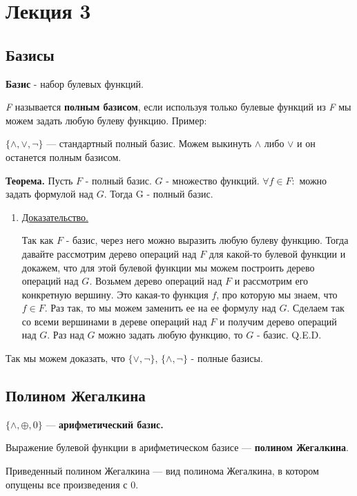 \documentclass{article}
\begin{document}
\section{Лекция 3}
\subsection{Базисы}

\textbf{Базис} - набор булевых функций.

\textit{F} называется \textbf{полным базисом}, если используя только булевые функций из \textit{F} мы можем задать любую булеву функцию. Пример:

$\{\wedge, \vee, \neg\}$ ---  стандартный полный базис. Можем выкинуть $\wedge$ либо $\vee$ 
 и он останется полным базисом.

\textbf{Теорема.} Пусть $F$ - полный базис. $G$ - множество функций.
$\forall f \in F:$ можно задать формулой над $G$.
Тогда G - полный базис.

\begin{enumerate}

\item[] \uline{Доказательство.}

Так как $F$ - базис, через него можно выразить любую булеву функцию. Тогда давайте рассмотрим дерево операций над $F$ для какой-то булевой функции и докажем, что для этой булевой функции мы можем построить дерево операций над $G$. Возьмем дерево операций над $F$ и рассмотрим его конкретную вершину. Это какая-то функция $f$, про которую мы знаем, что $f \in F$. Раз так, то мы можем заменить ее на ее формулу над $G$. Сделаем так со всеми вершинами в дереве операций над $F$ и получим дерево операций над $G$. Раз над $G$ можно задать любую функцию, то $G$ - базис. Q.E.D.

\end{enumerate}

Так мы можем доказать, что $\{\vee, \neg\}$, $\{\wedge, \neg\}$ - полные базисы.

\subsection{Полином Жегалкина}

$\{\wedge, \oplus, 0\}$ --- \textbf{арифметический базис.}

Выражение булевой функции в арифметическом базисе --- \textbf{полином Жегалкина}.

Приведенный полином Жегалкина --- вид полинома Жегалкина, в котором опущены все произведения с 0. 
\end{document}
